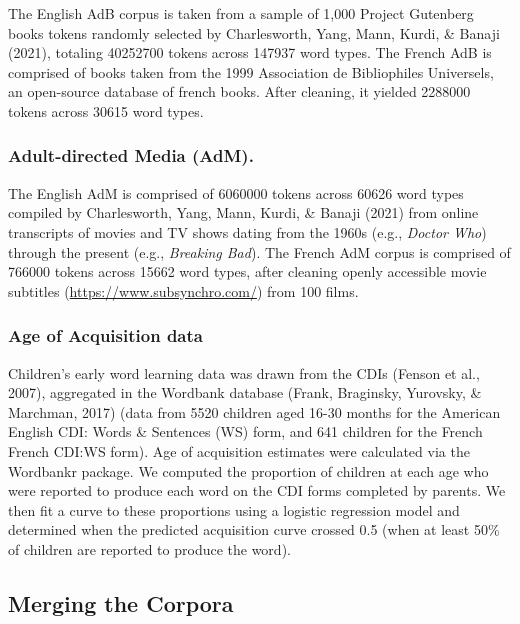 \documentclass[10pt, letterpaper]{article}
\begin{document}
The English AdB corpus is taken from a sample of 1,000 Project Gutenberg
books tokens randomly selected by Charlesworth, Yang, Mann, Kurdi, \&
Banaji (2021), totaling 40252700 tokens across 147937 word types. The
French AdB is comprised of books taken from the 1999 Association de
Bibliophiles Universels, an open-source database of french books. After
cleaning, it yielded 2288000 tokens across 30615 word types.

\hypertarget{adult-directed-media-adm.}{%
\subsubsection{Adult-directed Media
(AdM).}\label{adult-directed-media-adm.}}

The English AdM is comprised of 6060000 tokens across 60626 word types
compiled by Charlesworth, Yang, Mann, Kurdi, \& Banaji (2021) from
online transcripts of movies and TV shows dating from the 1960s (e.g.,
\emph{Doctor Who}) through the present (e.g., \emph{Breaking Bad}). The
French AdM corpus is comprised of 766000 tokens across 15662 word types,
after cleaning openly accessible movie subtitles
(\url{https://www.subsynchro.com/}) from 100 films.

\hypertarget{age-of-acquisition-data}{%
\subsubsection{Age of Acquisition data}\label{age-of-acquisition-data}}

Children's early word learning data was drawn from the CDIs (Fenson et
al., 2007), aggregated in the Wordbank database (Frank, Braginsky,
Yurovsky, \& Marchman, 2017) (data from 5520 children aged 16-30 months
for the American English CDI: Words \& Sentences (WS) form, and 641
children for the French French CDI:WS form). Age of acquisition
estimates were calculated via the Wordbankr package. We computed the
proportion of children at each age who were reported to produce each
word on the CDI forms completed by parents. We then fit a curve to these
proportions using a logistic regression model and determined when the
predicted acquisition curve crossed 0.5 (when at least 50\% of children
are reported to produce the word).

\hypertarget{merging-the-corpora}{%
\subsection{Merging the Corpora}\label{merging-the-corpora}}
\end{document}
